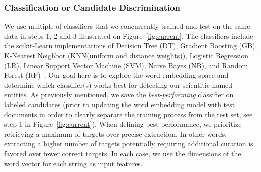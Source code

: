 \subsubsection{Classification or Candidate Discrimination}
We use multiple of classifiers that we concurrently trained and test on the same data in steps 1, 2 and 3 illustrated on Figure~\ref{fig:current}.
The classifiers include the scikit-Learn implementations of Decision Tree (DT), Gradient Boosting (GB), K-Nearest Neighbor (KNN(uniform and distance weights)), Logistic Regression (LR), Linear Support Vector Machine (SVM), Naive Bayes (NB), and Random Forest (RF)~\cite{scikit-learn}. 
Our goal here is to explore the word embedding space and determine which classifier(s) works best for detecting our scientitic named entities.
As previously mentioned, we save the \textit{best-performing} classifier on labeled candidates (prior to updating the word embedding model  with test documents in order to clearly separate the training process from the test set, see step 1 in Figure~\ref{fig:current}).
When defining best performance, we prioritize retrieving a maximum of targets over precise extraction.
In other words, extracting a higher number of targets potentially requiring additional curation is favored over fewer correct targets.
In each case, we use the dimensions of the word vector for each string as input features.




